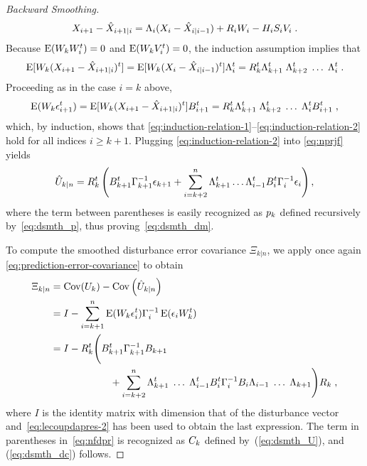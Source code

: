 \begin{proof}[Backward Smoothing]
\begin{equation}
\label{eq:diffffpreddd}
X_{i+1} - \hat{X}_{i+1|i} = \Lambda_{i} (X_i - \hat{X}_{i|i-1}) + R_i W_i - H_{i} S_i V_i \; .
\end{equation}
Because $\operatorname{E}(W_k W_i^t)= 0$ and $\operatorname{E}(W_k V_i^t)=0$, the induction assumption implies that
\begin{equation}
\label{eq:lecoupdapres-1}
\operatorname{E}[W_k(X_{i+1} - \hat{X}_{i+1|i})^t] = \operatorname{E}[W_k(X_i - \hat{X}_{i|i-1})^t] \Lambda_{i}^t = R_k^t \Lambda_{k+1}^t \; \Lambda_{k+2}^t \; \dotsc \; \Lambda_{i}^t \; .
\end{equation}
Proceeding as in the case $i=k$ above,
\begin{equation}
\label{eq:lecoupdapres-2}
\operatorname{E}(W_k \epsilon_{i+1}^t) = \operatorname{E}[W_k(X_{i+1} - \hat{X}_{i+1|i})^t] B_{i+1}^t = R_k^t \Lambda_{k+1}^t \; \Lambda_{k+2}^t \; \dotsc \; \Lambda_{i}^t B_{i+1}^t \; ,
\end{equation}
which, by induction, shows that \eqref{eq:induction-relation-1}--\eqref{eq:induction-relation-2} hold for all indices $i\geq k+1$. Plugging \eqref{eq:induction-relation-2} into \eqref{eq:nprjf} yields
\begin{equation}
\label{eq:expression-smoothed-disturbance}
\hat{U}_{k|n} = R_k^t\left( B^t_{k+1}\Gamma_{k+1}^{-1}\epsilon_{k+1} + \sum_{i=k+2}^n \Lambda_{k+1}^t  \dots \Lambda_{i-1}^t B_i^t\Gamma_{i}^{-1}\epsilon_{i} \right) ,
\end{equation}
where the term between parentheses is easily recognized as $p_k$ defined
recursively by~\eqref{eq:dsmth_p}, thus proving~\eqref{eq:dsmth_dm}.

To compute the smoothed disturbance error covariance $\Xi_{k|n}$, we apply once again \eqref{eq:prediction-error-covariance} to obtain
\begin{align}
  \label{eq:nfdpr}
  \Xi_{k|n} & = \operatorname{Cov}(U_k) - \operatorname{Cov}\left( \hat{U}_{k|n} \right)\\
  \nonumber & = I - \sum_{i=k+1}^n \operatorname{E}(W_k \epsilon_i^t) \Gamma^{-1}_i \operatorname{E}(\epsilon_i W_k^t) \\
  \nonumber & = I - R_k^t\Biggr( B_{k+1}^t \Gamma^{-1}_{k+1} B_{k+1} \\
 \nonumber & \qquad \qquad \qquad + \sum_{i=k+2}^n \Lambda_{k+1}^t \; \dotsc \; \Lambda_{i-1}^t B_i^t \Gamma^{-1}_i B_i  \Lambda_{i-1} \; \dotsc \; \Lambda_{k+1} \Biggr)R_k \;,
\end{align}
where $I$ is the identity matrix with dimension that of the disturbance vector
and~\eqref{eq:lecoupdapres-2} has been used to obtain the last expression. The
term in parentheses in~\eqref{eq:nfdpr} is recognized as $C_{k}$ defined by~(\ref{eq:dsmth_U}), and (\ref{eq:dsmth_dc}) follows.
\end{proof}

